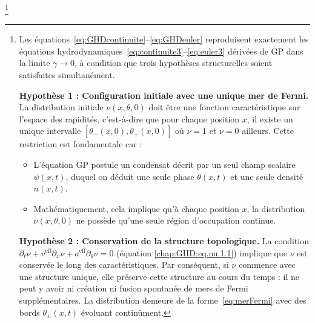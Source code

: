 \footnote{%

Les équations~\eqref{eq:GHDcontinuite}--\eqref{eq:GHDeuler} reproduisent exactement les équations hydrodynamiques~\eqref{eq:continuite3}--\eqref{eq:euler3} dérivées de \gls{GP} dans la limite $\gamma \to 0$, à condition que trois hypothèses structurelles soient satisfaites simultanément.

\medskip

\noindent\textbf{Hypothèse 1 : Configuration initiale avec une unique mer de Fermi.}  
La distribution initiale $\nu(x,\theta,0)$ doit être une fonction caractéristique sur l'espace des rapidités, c'est-à-dire que pour chaque position $x$, il existe un unique intervalle $[\theta_-(x,0), \theta_+(x,0)]$ où $\nu = 1$ et $\nu = 0$ ailleurs. Cette restriction est fondamentale car :

\begin{itemize}[label=$\bullet$]
	\item L'équation \gls{GP} postule un condensat décrit par un seul champ scalaire $\psi(x,t)$, duquel on déduit une seule phase $\theta(x,t)$ et une seule densité $n(x,t)$.
	\item Mathématiquement, cela implique qu'à chaque position $x$, la distribution $\nu(x,\theta,0)$ ne possède qu'une seule région d'occupation continue.
\end{itemize}

\medskip

\noindent\textbf{Hypothèse 2 : Conservation de la structure topologique.}  
La condition $\partial_t\nu + v^{\mathrm{eff}}\partial_x\nu + a^{\mathrm{eff}}\partial_\theta\nu = 0$ (équation \eqref{chap:GHD:eq.nu.1.1}) implique que $\nu$ est conservée le long des caractéristiques. Par conséquent, si $\nu$ commence avec une structure unique, elle préserve cette structure au cours du temps : il ne peut y avoir ni création ni fusion spontanée de mers de Fermi supplémentaires. La distribution demeure de la forme~\eqref{eq:merFermi} avec des bords $\theta_\pm(x,t)$ évoluant continûment.

}
